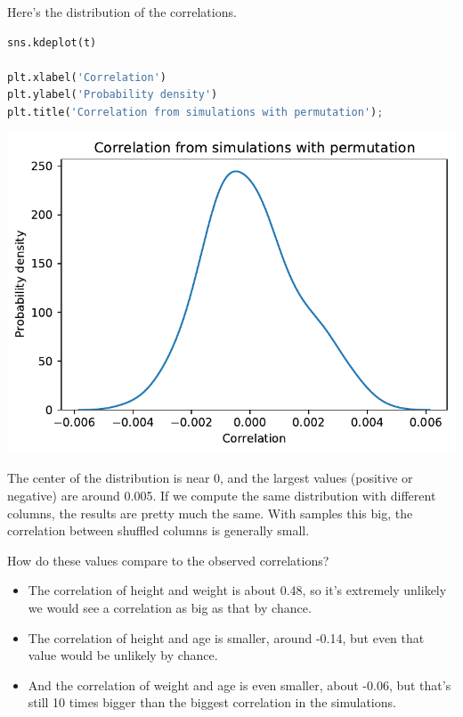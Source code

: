 Here's the distribution of the correlations.

\begin{lstlisting}[language=Python,style=source]
sns.kdeplot(t)

plt.xlabel('Correlation')
plt.ylabel('Probability density')
plt.title('Correlation from simulations with permutation');
\end{lstlisting}

\begin{center}
\includegraphics[scale=0.75]{13_hypothesis_files/13_hypothesis_108_0.pdf}
\end{center}

The center of the distribution is near 0, and the largest values
(positive or negative) are around 0.005. If we compute the same
distribution with different columns, the results are pretty much the
same. With samples this big, the correlation between shuffled columns is
generally small.

How do these values compare to the observed correlations?

\begin{itemize}
\item
  The correlation of height and weight is about 0.48, so it's extremely
  unlikely we would see a correlation as big as that by chance.
\item
  The correlation of height and age is smaller, around -0.14, but even
  that value would be unlikely by chance.
\item
  And the correlation of weight and age is even smaller, about -0.06,
  but that's still 10 times bigger than the biggest correlation in the
  simulations.
\end{itemize}

